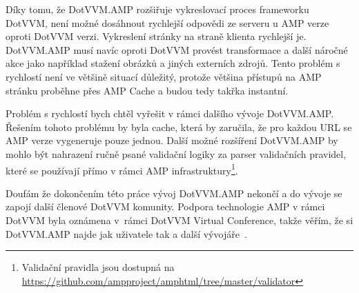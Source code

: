 Díky tomu, že DotVVM.AMP rozšiřuje vykreslovací proces frameworku DotVVM, není možné dosáhnout rychlejší odpovědi ze serveru u AMP verze oproti DotVVM verzi. Vykreslení stránky na straně klienta rychlejší je. DotVVM.AMP musí navíc oproti DotVVM provést transformace a další náročné akce jako například stažení obrázků a jiných externích zdrojů. Tento problém s rychlostí není ve většině situací důležitý, protože většina přístupů na AMP stránku proběhne přes AMP Cache a budou tedy takřka instantní.

Problém s rychlostí bych chtěl vyřešit v rámci dalšího vývoje DotVVM.AMP. Řešením tohoto problému by byla cache, která by zaručila, že pro každou URL se AMP verze vygeneruje pouze jednou. Další možné rozšíření DotVVM.AMP by mohlo být nahrazení ručně psané validační logiky za parser validačních pravidel, které se používají přímo v rámci AMP infrastruktury\footnote{Validační pravidla jsou dostupná na \url{https://github.com/ampproject/amphtml/tree/master/validator}}.

Doufám že dokončením této práce vývoj DotVVM.AMP nekončí a do vývoje se zapojí další členové DotVVM komunity. Podpora technologie AMP v rámci DotVVM byla oznámena v~rámci DotVVM Virtual Conference, takže věřím, že si DotVVM.AMP najde jak uživatele tak a další vývojáře~\cite{herceg_2020}.